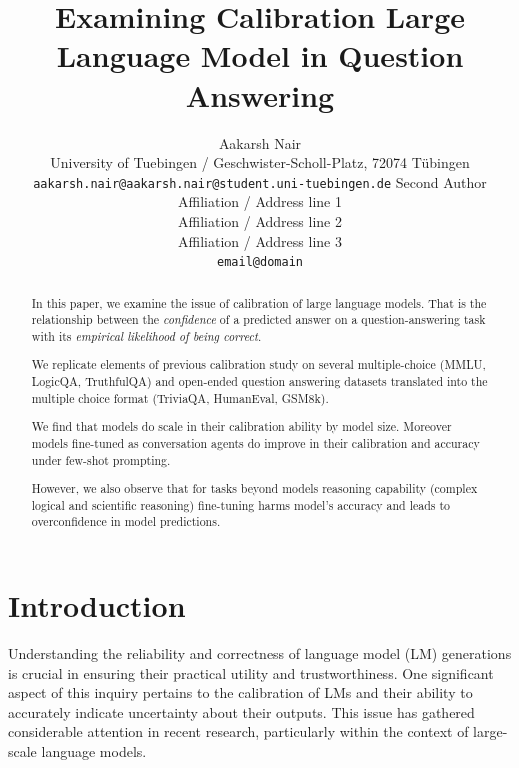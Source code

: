 \documentclass[11pt]{article}
\title{Examining Calibration Large Language Model in Question Answering}
\author{Aakarsh Nair\\
  University of Tuebingen / Geschwister-Scholl-Platz, 72074 Tübingen\\
  \texttt{aakarsh.nair@aakarsh.nair@student.uni-tuebingen.de} 
  Second Author \\
  Affiliation / Address line 1 \\
  Affiliation / Address line 2 \\
  Affiliation / Address line 3 \\
  \texttt{email@domain} \\}
\begin{document}
\maketitle


\begin{abstract}
In this paper, we examine the issue of calibration of large language models. 
That is the relationship between the \emph{confidence} 
of a predicted answer on a question-answering task 
with its \emph{empirical likelihood of being correct}.

We replicate elements of previous calibration study \cite{kadavath2022language} 
on several multiple-choice  (MMLU, LogicQA, TruthfulQA) and 
open-ended question answering datasets translated into 
the multiple choice format (TriviaQA, HumanEval, GSM8k). 

We find that models do scale in their calibration ability by model size. Moreover models fine-tuned as conversation agents do 
improve in their calibration and accuracy under 
few-shot prompting. 

However, we also observe that for tasks beyond models 
reasoning  capability (complex logical and scientific reasoning) 
fine-tuning harms model's accuracy and leads to 
overconfidence in model predictions.

\end{abstract}


\section{Introduction}


Understanding the reliability and correctness of language model (LM) generations is crucial in ensuring their practical utility and trustworthiness. One significant aspect of this inquiry pertains to the calibration of LMs and their ability to accurately indicate uncertainty about their outputs. This issue has gathered considerable attention in recent research, particularly within the context of large-scale language models.
\end{document}
